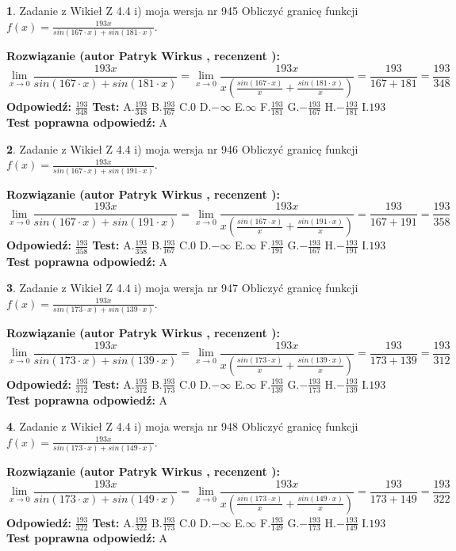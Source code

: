\documentclass[12pt, a4paper]{article}
\theoremstyle{definition} %
\newtheorem{zad}{}
\newcommand{\zadStart}[1]{\begin{zad}#1\newline}
\newcommand{\zadStop}{\end{zad}}
\newcommand{\rozwStart}[2]{\noindent \textbf{Rozwiązanie (autor #1 , recenzent #2): }\newline}
\newcommand{\rozwStop}{\newline}
\newcommand{\odpStart}{\noindent \textbf{Odpowiedź:}\newline}
\newcommand{\odpStop}{\newline}
\newcommand{\testStart}{\noindent \textbf{Test:}\newline}
\newcommand{\testStop}{\newline}
\newcommand{\kluczStart}{\noindent \textbf{Test poprawna odpowiedź:}\newline}
\newcommand{\kluczStop}{\newline}
\begin{document}
\zadStart{Zadanie z Wikieł Z 4.4 i) moja wersja nr 945}
Obliczyć granicę funkcji $f(x)=\frac{193x}{sin(167\cdot x) +sin(181\cdot x)}$.
\zadStop
\rozwStart{Patryk Wirkus}{}
$$\lim\limits_{x\to 0}\frac{193x}{sin(167\cdot x) +sin(181\cdot x)}=\lim\limits_{x\to 0}\frac{193x}{x(\frac{sin(167\cdot x)}{x}+\frac{sin(181\cdot x)}{x})}=\frac{193}{167+181} = \frac{193}{348}$$
\rozwStop
\odpStart
$\frac{193}{348}$
\odpStop
\testStart
A.$\frac{193}{348}$
B.$\frac{193}{167}$
C.$0$
D.$-\infty$
E.$\infty$
F.$\frac{193}{181}$
G.$-\frac{193}{167}$
H.$-\frac{193}{181}$
I.$193$
\testStop
\kluczStart
A
\kluczStop



\zadStart{Zadanie z Wikieł Z 4.4 i) moja wersja nr 946}
Obliczyć granicę funkcji $f(x)=\frac{193x}{sin(167\cdot x) +sin(191\cdot x)}$.
\zadStop
\rozwStart{Patryk Wirkus}{}
$$\lim\limits_{x\to 0}\frac{193x}{sin(167\cdot x) +sin(191\cdot x)}=\lim\limits_{x\to 0}\frac{193x}{x(\frac{sin(167\cdot x)}{x}+\frac{sin(191\cdot x)}{x})}=\frac{193}{167+191} = \frac{193}{358}$$
\rozwStop
\odpStart
$\frac{193}{358}$
\odpStop
\testStart
A.$\frac{193}{358}$
B.$\frac{193}{167}$
C.$0$
D.$-\infty$
E.$\infty$
F.$\frac{193}{191}$
G.$-\frac{193}{167}$
H.$-\frac{193}{191}$
I.$193$
\testStop
\kluczStart
A
\kluczStop



\zadStart{Zadanie z Wikieł Z 4.4 i) moja wersja nr 947}
Obliczyć granicę funkcji $f(x)=\frac{193x}{sin(173\cdot x) +sin(139\cdot x)}$.
\zadStop
\rozwStart{Patryk Wirkus}{}
$$\lim\limits_{x\to 0}\frac{193x}{sin(173\cdot x) +sin(139\cdot x)}=\lim\limits_{x\to 0}\frac{193x}{x(\frac{sin(173\cdot x)}{x}+\frac{sin(139\cdot x)}{x})}=\frac{193}{173+139} = \frac{193}{312}$$
\rozwStop
\odpStart
$\frac{193}{312}$
\odpStop
\testStart
A.$\frac{193}{312}$
B.$\frac{193}{173}$
C.$0$
D.$-\infty$
E.$\infty$
F.$\frac{193}{139}$
G.$-\frac{193}{173}$
H.$-\frac{193}{139}$
I.$193$
\testStop
\kluczStart
A
\kluczStop



\zadStart{Zadanie z Wikieł Z 4.4 i) moja wersja nr 948}
Obliczyć granicę funkcji $f(x)=\frac{193x}{sin(173\cdot x) +sin(149\cdot x)}$.
\zadStop
\rozwStart{Patryk Wirkus}{}
$$\lim\limits_{x\to 0}\frac{193x}{sin(173\cdot x) +sin(149\cdot x)}=\lim\limits_{x\to 0}\frac{193x}{x(\frac{sin(173\cdot x)}{x}+\frac{sin(149\cdot x)}{x})}=\frac{193}{173+149} = \frac{193}{322}$$
\rozwStop
\odpStart
$\frac{193}{322}$
\odpStop
\testStart
A.$\frac{193}{322}$
B.$\frac{193}{173}$
C.$0$
D.$-\infty$
E.$\infty$
F.$\frac{193}{149}$
G.$-\frac{193}{173}$
H.$-\frac{193}{149}$
I.$193$
\testStop
\kluczStart
A
\kluczStop
\end{document}
